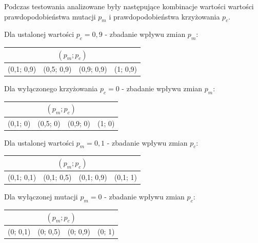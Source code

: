 \documentclass[12pt, a4paper]{article}
\begin{document}
Podczas testowania analizowane były następujące kombinacje wartości wartości prawdopodobieństwa mutacji $p_m$ i prawdopodobieństwa krzyżowania $p_c$.

\bigskip

Dla ustalonej wartości $p_c = 0,9$ - zbadanie wpływu zmian $p_m$:
\begin{center}
\begin{tabular}{|l|l|l|l|}
\hline
\multicolumn{4}{|c|}{$(p_m; p_c)$} \\
\hline
(0,1; 0,9) & (0,5; 0,9) & (0,9; 0,9) & (1; 0,9)\\
\hline
\end{tabular}
\end{center}

\bigskip

Dla wyłączonego krzyżowania $p_c = 0$ - zbadanie wpływu zmian $p_m$:
\begin{center}
\begin{tabular}{|l|l|l|l|}
\hline
\multicolumn{4}{|c|}{$(p_m; p_c)$} \\
\hline
(0,1; 0) & (0,5; 0) & (0,9; 0) & (1; 0)\\
\hline
\end{tabular}
\end{center}

\bigskip

Dla ustalonej wartości $p_m = 0,1$ - zbadanie wpływu zmian $p_c$:
\begin{center}
\begin{tabular}{|l|l|l|l|}
\hline
\multicolumn{4}{|c|}{$(p_m; p_c)$} \\
\hline
(0,1; 0,1) & (0,1; 0,5) & (0,1; 0,9) & (0,1; 1)\\
\hline
\end{tabular}
\end{center}

\bigskip

Dla wyłączonej mutacji $p_m = 0$ - zbadanie wpływu zmian $p_c$:
\begin{center}
\begin{tabular}{|l|l|l|l|}
\hline
\multicolumn{4}{|c|}{$(p_m; p_c)$} \\
\hline
(0; 0,1) & (0; 0,5) & (0; 0,9) & (0; 1)\\
\hline
\end{tabular}
\end{center}

\bigskip
\end{document}
